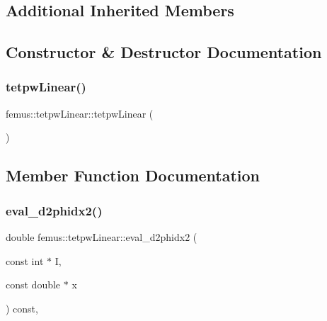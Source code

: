 \subsection*{Additional Inherited Members}


\subsection{Constructor \& Destructor Documentation}
\mbox{\label{classfemus_1_1tetpw_linear_a9b4a3c907e55b240cda57d36b5dc1a61}} 
\subsubsection{\texorpdfstring{tetpw\+Linear()}{tetpwLinear()}}
{\footnotesize\ttfamily femus\+::tetpw\+Linear\+::tetpw\+Linear (\begin{DoxyParamCaption}{ }\end{DoxyParamCaption})\hspace{0.3cm}{\ttfamily [inline]}}



\subsection{Member Function Documentation}
\mbox{\label{classfemus_1_1tetpw_linear_a2239d19a7d3a723383d68d5c38bfdbea}} 
\subsubsection{\texorpdfstring{eval\+\_\+d2phidx2()}{eval\_d2phidx2()}}
{\footnotesize\ttfamily double femus\+::tetpw\+Linear\+::eval\+\_\+d2phidx2 (\begin{DoxyParamCaption}\item[{const int $\ast$}]{I,  }\item[{const double $\ast$}]{x }\end{DoxyParamCaption}) const\hspace{0.3cm}{\ttfamily [inline]}, {\ttfamily [virtual]}}



